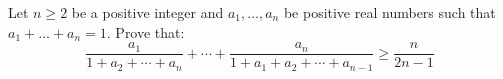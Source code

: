 Let $n \geq 2$ be a positive integer and $a_{1},\ldots , a_{n}$ be positive real numbers such that $a_{1}+...+a_{n}= 1$. Prove that:\[\frac{a_{1}}{1+a_{2}+\cdots +a_{n}}+\cdots +\frac{a_{n}}{1+a_{1}+a_{2}+\cdots +a_{n-1}}\geq \frac{n}{2n-1}\]